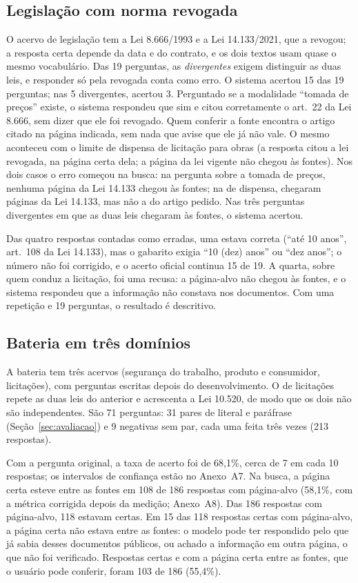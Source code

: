 \documentclass[12pt]{article}
\begin{document}
\subsection{Legislação com norma revogada}
\label{sec:res-legislacao}

O acervo de legislação tem a Lei 8.666/1993 e a Lei 14.133/2021, que a revogou; a resposta certa depende da data e do contrato, e os dois textos usam quase o mesmo vocabulário. Das 19 perguntas, as \emph{divergentes} exigem distinguir as duas leis, e responder só pela revogada conta como erro. O sistema acertou 15 das 19 perguntas; nas 5 divergentes, acertou 3. Perguntado se a modalidade ``tomada de preços'' existe, o sistema respondeu que sim e citou corretamente o art.~22 da Lei 8.666, sem dizer que ele foi revogado. Quem conferir a fonte encontra o artigo citado na página indicada, sem nada que avise que ele já não vale. O mesmo aconteceu com o limite de dispensa de licitação para obras (a resposta citou a lei revogada, na página certa dela; a página da lei vigente não chegou às fontes). Nos dois casos o erro começou na busca: na pergunta sobre a tomada de preços, nenhuma página da Lei 14.133 chegou às fontes; na de dispensa, chegaram páginas da Lei 14.133, mas não a do artigo pedido. Nas três perguntas divergentes em que as duas leis chegaram às fontes, o sistema acertou.

Das quatro respostas contadas como erradas, uma estava correta (``até 10 anos'', art.~108 da Lei 14.133), mas o gabarito exigia ``10 (dez) anos'' ou ``dez anos''; o número não foi corrigido, e o acerto oficial continua 15 de 19. A quarta, sobre quem conduz a licitação, foi uma recusa: a página-alvo não chegou às fontes, e o sistema respondeu que a informação não constava nos documentos. Com uma repetição e 19 perguntas, o resultado é descritivo.

\subsection{Bateria em três domínios}
\label{sec:res-bateria}

A bateria tem três acervos (segurança do trabalho, produto e consumidor, licitações), com perguntas escritas depois do desenvolvimento. O de licitações repete as duas leis do anterior e acrescenta a Lei 10.520, de modo que os dois não são independentes. São 71 perguntas: 31 pares de literal e paráfrase (Seção~\ref{sec:avaliacao}) e 9 negativas sem par, cada uma feita três vezes (213 respostas).

Com a pergunta original, a taxa de acerto foi de 68,1\%, cerca de 7 em cada 10 respostas; os intervalos de confiança estão no Anexo~A7. Na busca, a página certa esteve entre as fontes em 108 de 186 respostas com página-alvo (58,1\%, com a métrica corrigida depois da medição; Anexo~A8). Das 186 respostas com página-alvo, 118 estavam certas. Em 15 das 118 respostas certas com página-alvo, a página certa não estava entre as fontes: o modelo pode ter respondido pelo que já sabia desses documentos públicos, ou achado a informação em outra página, o que não foi verificado. Respostas certas e com a página certa entre as fontes, que o usuário pode conferir, foram 103 de 186 (55,4\%).
\end{document}
